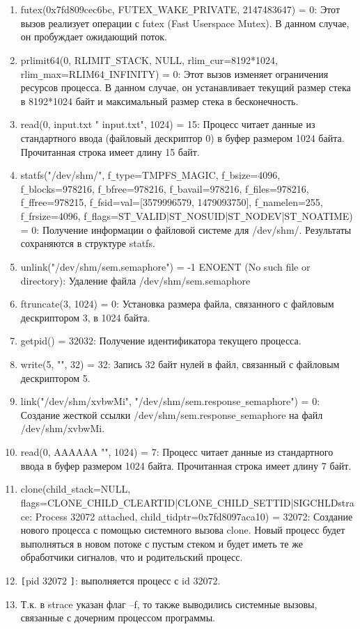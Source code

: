 \documentclass[a4paper, 14pt]{article}
\begin{document}
\begin{enumerate}
    \item futex(0x7fd809cec6bc, FUTEX\texttt{\_}WAKE\texttt{\_}PRIVATE, 2147483647) = 0: Этот вызов реализует операции с futex (Fast Userspace Mutex). В данном случае, он пробуждает ожидающий поток.
    \item prlimit64(0, RLIMIT\texttt{\_}STACK, NULL, {rlim\texttt{\_}cur=8192*1024, rlim\texttt{\_}max=RLIM64\texttt{\_}INFINITY}) = 0: Этот вызов изменяет ограничения ресурсов процесса. В данном случае, он устанавливает текущий размер стека в 8192*1024 байт и максимальный размер стека в бесконечность.
    \item read(0, input.txt " input.txt\n", 1024) = 15: Процесс читает данные из стандартного ввода (файловый дескриптор 0) в буфер размером 1024 байта. Прочитанная строка имеет длину 15 байт.
    \item statfs("/dev/shm/", {f\texttt{\_}type=TMPFS\texttt{\_}MAGIC, f\texttt{\_}bsize=4096, f\texttt{\_}blocks=978216, f\texttt{\_}bfree=978216, f\texttt{\_}bavail=978216, f\texttt{\_}files=978216, f\texttt{\_}ffree=978215, f\texttt{\_}fsid={val=[3579996579, 1479093750]}, f\texttt{\_}namelen=255, f\texttt{\_}frsize=4096, f\texttt{\_}flags=ST\texttt{\_}VALID|ST\texttt{\_}NOSUID|ST\texttt{\_}NODEV|ST\texttt{\_}NOATIME}) = 0: Получение информации о файловой системе для /dev/shm/. Результаты сохраняются в структуре statfs.
    \item unlink("/dev/shm/sem.semaphore") = -1 ENOENT (No such file or directory): Удаление файла /dev/shm/sem.semaphore
    \item ftruncate(3, 1024) = 0: Установка размера файла, связанного с файловым дескриптором 3, в 1024 байта.
    \item getpid() = 32032: Получение идентификатора текущего процесса.
    \item write(5, "\0\0\0\0\0\0\0\0\0\0\0\0\0\0\0\0\0\0\0\0\0\0\0\0\0\0\0\0\0\0\0", 32) = 32: Запись 32 байт нулей в файл, связанный с файловым дескриптором 5.
    \item link("/dev/shm/xvbwMi", "/dev/shm/sem.response\texttt{\_}semaphore") = 0: Создание жесткой ссылки /dev/shm/sem.response\texttt{\_}semaphore на файл /dev/shm/xvbwMi.
    \item read(0, AAAAAA "\n", 1024) = 7: Процесс читает данные из стандартного ввода в буфер размером 1024 байта. Прочитанная строка имеет длину 7 байт.
    \item clone(child\texttt{\_}stack=NULL, flags=CLONE\texttt{\_}CHILD\texttt{\_}CLEARTID|CLONE\texttt{\_}CHILD\texttt{\_}SETTID|SIGCHLDstrace: Process 32072 attached, child\texttt{\_}tidptr=0x7fd8097aca10) = 32072: Создание нового процесса с помощью системного вызова clone. Новый процесс будет выполняться в новом потоке с пустым стеком и будет иметь те же обработчики сигналов, что и родительский процесс.
    \item \texttt{[}pid 32072 \texttt{]}: выполняется процесс с id 32072.
    \item Т.к. в strace указан флаг –f, то также выводились системные вызовы, связанные с дочерним процессом программы.
\end{enumerate}
\end{document}
